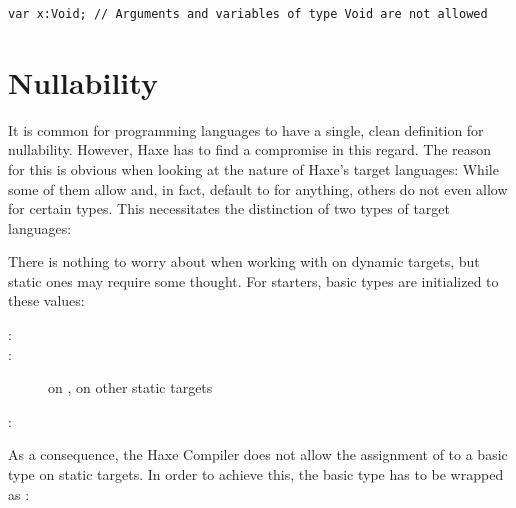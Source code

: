 \documentclass{haxe}
\begin{document}
\begin{lstlisting}
var x:Void; // Arguments and variables of type Void are not allowed
\end{lstlisting}



\section{Nullability}
\label{types-nullability}


It is common for programming languages to have a single, clean definition for nullability. However, Haxe has to find a compromise in this regard. The reason for this is obvious when looking at the nature of Haxe's target languages: While some of them allow and, in fact, default to  for anything, others do not even allow  for certain types. This necessitates the distinction of two types of target languages:


There is nothing to worry about when working with  on dynamic targets, but static ones may require some thought. For starters, basic types are initialized to these values:

\begin{description}
	\item[:] 
	\item[:]  on ,  on other static targets
	\item[:] 
\end{description}
As a consequence, the Haxe Compiler does not allow the assignment of  to a basic type on static targets. In order to achieve this, the basic type has to be wrapped as :
\end{document}
